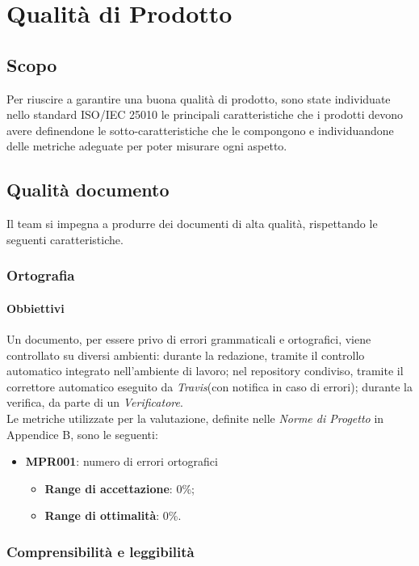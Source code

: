 \chapter{Qualità di Prodotto}
\label{prodotto}
\section{Scopo}
Per riuscire a garantire una buona qualità di prodotto, sono state individuate nello standard ISO/IEC 25010 le principali caratteristiche che i prodotti devono avere definendone le sotto-caratteristiche che le compongono e individuandone delle metriche adeguate per poter misurare ogni aspetto.

\section{Qualità documento}
\label{documento}
Il team si impegna a produrre dei documenti di alta qualità, rispettando le seguenti caratteristiche.
\subsection{Ortografia}
\subsubsection{Obbiettivi}
Un documento, per essere privo di errori grammaticali e ortografici, viene controllato su diversi ambienti: durante la redazione, tramite il controllo automatico integrato nell'ambiente di lavoro; nel repository condiviso, tramite il correttore automatico eseguito da \textit{Travis}(con notifica in caso di errori); durante la verifica, da parte di un \textit{Verificatore}.\\
Le metriche utilizzate per la valutazione, definite nelle \textit{Norme di Progetto} in Appendice B, sono le seguenti:
\begin{itemize}
	\item \textbf{MPR001}: numero di errori ortografici
	\begin{itemize}
		\item \textbf{Range di accettazione}: 0\%;
		\item \textbf{Range di ottimalità}: 0\%.
	\end{itemize}
\end{itemize}
\subsection{Comprensibilità e leggibilità}
